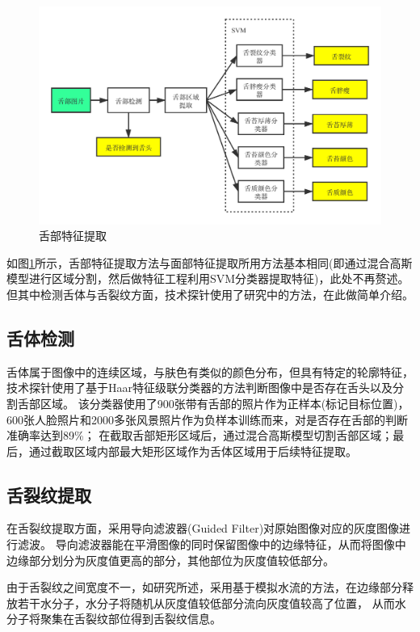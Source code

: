 \begin{figure}[htb]
    \centering
    \includegraphics[width=15cm]{images/tongue-feature.png}
    \caption{舌部特征提取}
    \label{fig:tongue_feature}
\end{figure}

如图\ref{fig:tongue_feature}所示，舌部特征提取方法与面部特征提取所用方法基本相同(即通过混合高斯模型进行区域分割，然后做特征工程利用SVM分类器提取特征)，此处不再赘述。
但其中检测舌体与舌裂纹方面，技术探针使用了研究\cite{zhang2018computer}中的方法，在此做简单介绍。

\subsection{舌体检测}
舌体属于图像中的连续区域，与肤色有类似的颜色分布，但具有特定的轮廓特征，技术探针使用了基于Haar特征级联分类器的方法\cite{zhang2018computer}判断图像中是否存在舌头以及分割舌部区域。
该分类器使用了900张带有舌部的照片作为正样本(标记目标位置)，600张人脸照片和2000多张风景照片作为负样本训练而来，对是否存在舌部的判断准确率达到89\%\cite{zhang2018computer}；
在截取舌部矩形区域后，通过混合高斯模型切割舌部区域；最后，通过截取区域内部最大矩形区域作为舌体区域用于后续特征提取。

\subsection{舌裂纹提取}
在舌裂纹提取方面，采用导向滤波器(Guided Filter)\cite{he2010guided}对原始图像对应的灰度图像进行滤波。
导向滤波器能在平滑图像的同时保留图像中的边缘特征，从而将图像中边缘部分划分为灰度值更高的部分，其他部位为灰度值较低部分。

由于舌裂纹之间宽度不一，如研究\cite{zhang2018computer}所述，采用基于模拟水流的方法，在边缘部分释放若干水分子，水分子将随机从灰度值较低部分流向灰度值较高了位置，
从而水分子将聚集在舌裂纹部位得到舌裂纹信息。

